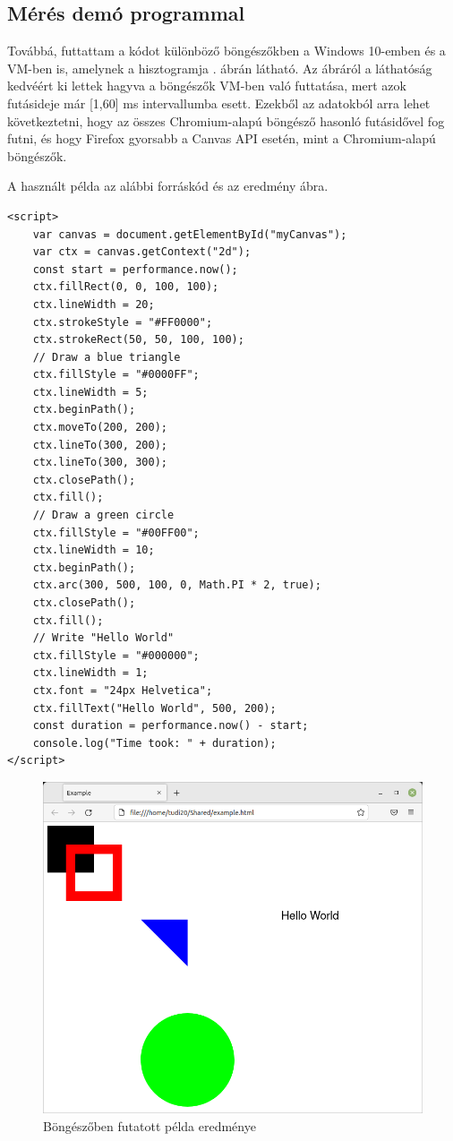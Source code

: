 \subsection{Mérés demó programmal}

Továbbá, futtattam a kódot különböző böngészőkben a Windows 10-emben és a VM-ben is, amelynek a hisztogramja . ábrán látható. Az ábráról a láthatóság kedvéért ki lettek hagyva a böngészők VM-ben való futtatása, mert azok futásideje már [1,60] ms intervallumba esett. Ezekből az adatokból arra lehet következtetni, hogy az összes Chromium-alapú böngésző hasonló futásidővel fog futni, és hogy Firefox gyorsabb a Canvas API esetén, mint a Chromium-alapú böngészők.

A használt példa az alábbi forráskód és az eredmény  ábra.

\begin{verbatim}
<script>
    var canvas = document.getElementById("myCanvas");
    var ctx = canvas.getContext("2d");
    const start = performance.now();
    ctx.fillRect(0, 0, 100, 100);
    ctx.lineWidth = 20;
    ctx.strokeStyle = "#FF0000";
    ctx.strokeRect(50, 50, 100, 100);
    // Draw a blue triangle
    ctx.fillStyle = "#0000FF";
    ctx.lineWidth = 5;
    ctx.beginPath();
    ctx.moveTo(200, 200);
    ctx.lineTo(300, 200);
    ctx.lineTo(300, 300);
    ctx.closePath();
    ctx.fill();
    // Draw a green circle
    ctx.fillStyle = "#00FF00";
    ctx.lineWidth = 10;
    ctx.beginPath();
    ctx.arc(300, 500, 100, 0, Math.PI * 2, true);
    ctx.closePath();
    ctx.fill();
    // Write "Hello World"
    ctx.fillStyle = "#000000";
    ctx.lineWidth = 1;
    ctx.font = "24px Helvetica";
    ctx.fillText("Hello World", 500, 200);
    const duration = performance.now() - start;
    console.log("Time took: " + duration);
</script>
\end{verbatim}

\begin{figure}[h!]
    \centering
    \includegraphics[width=8truecm]{images/browser_example.png}
    \caption{Böngészőben futatott példa eredménye}
    \label{fig:browser-canvas-example}
\end{figure}

